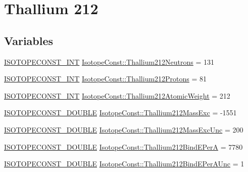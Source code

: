 \hypertarget{group___isotope_const-_thallium-_tl212}{}\section{Thallium 212}
\label{group___isotope_const-_thallium-_tl212}
\subsection*{Variables}
\begin{DoxyCompactItemize}
\item 
\mbox{\hyperlink{group___isotope_const-_macros_ga5f18360b3e99483a35c32d789e62621c}{I\+S\+O\+T\+O\+P\+E\+C\+O\+N\+S\+T\+\_\+\+I\+NT}} \mbox{\hyperlink{group___isotope_const-_thallium-_tl212_ga57082cc4724c6aa08206168417e239d1}{Isotope\+Const\+::\+Thallium212\+Neutrons}} = 131
\item 
\mbox{\hyperlink{group___isotope_const-_macros_ga5f18360b3e99483a35c32d789e62621c}{I\+S\+O\+T\+O\+P\+E\+C\+O\+N\+S\+T\+\_\+\+I\+NT}} \mbox{\hyperlink{group___isotope_const-_thallium-_tl212_ga6cbc7760ec8fb3af1ebd42dbf32fccdd}{Isotope\+Const\+::\+Thallium212\+Protons}} = 81
\item 
\mbox{\hyperlink{group___isotope_const-_macros_ga5f18360b3e99483a35c32d789e62621c}{I\+S\+O\+T\+O\+P\+E\+C\+O\+N\+S\+T\+\_\+\+I\+NT}} \mbox{\hyperlink{group___isotope_const-_thallium-_tl212_gae3d37d7d04c17c757f90836bb70bdbaa}{Isotope\+Const\+::\+Thallium212\+Atomic\+Weight}} = 212
\item 
\mbox{\hyperlink{group___isotope_const-_macros_ga8f45a7272ce02c0b4c65c44636ed719a}{I\+S\+O\+T\+O\+P\+E\+C\+O\+N\+S\+T\+\_\+\+D\+O\+U\+B\+LE}} \mbox{\hyperlink{group___isotope_const-_thallium-_tl212_ga3964c0a3d515ee86ae389f59c4e27700}{Isotope\+Const\+::\+Thallium212\+Mass\+Exc}} = -\/1551
\item 
\mbox{\hyperlink{group___isotope_const-_macros_ga8f45a7272ce02c0b4c65c44636ed719a}{I\+S\+O\+T\+O\+P\+E\+C\+O\+N\+S\+T\+\_\+\+D\+O\+U\+B\+LE}} \mbox{\hyperlink{group___isotope_const-_thallium-_tl212_ga203abf9efe9b2bdfbdf0ae455e7047fd}{Isotope\+Const\+::\+Thallium212\+Mass\+Exc\+Unc}} = 200
\item 
\mbox{\hyperlink{group___isotope_const-_macros_ga8f45a7272ce02c0b4c65c44636ed719a}{I\+S\+O\+T\+O\+P\+E\+C\+O\+N\+S\+T\+\_\+\+D\+O\+U\+B\+LE}} \mbox{\hyperlink{group___isotope_const-_thallium-_tl212_ga5a2faee46259a1cc4fbeb9755ae0d6d0}{Isotope\+Const\+::\+Thallium212\+Bind\+E\+PerA}} = 7780
\item 
\mbox{\hyperlink{group___isotope_const-_macros_ga8f45a7272ce02c0b4c65c44636ed719a}{I\+S\+O\+T\+O\+P\+E\+C\+O\+N\+S\+T\+\_\+\+D\+O\+U\+B\+LE}} \mbox{\hyperlink{group___isotope_const-_thallium-_tl212_gaae5ad380139db74bc43f1df6b31165bd}{Isotope\+Const\+::\+Thallium212\+Bind\+E\+Per\+A\+Unc}} = 1

\end{DoxyCompactItemize}
